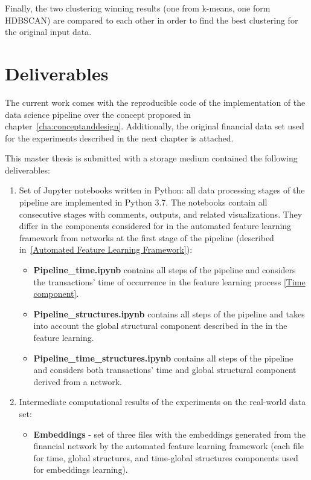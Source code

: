 Finally, the two clustering winning results (one from k-means, one form HDBSCAN) are compared to each other in order to find the best clustering for the original input data.

\section{Deliverables}
The current work comes with the reproducible code of the implementation of the data science pipeline over the concept proposed in chapter~\ref{cha:conceptanddesign}. Additionally, the original financial data set used for the experiments described in the next chapter is attached.

This master thesis is submitted with a storage medium contained the following deliverables:
\begin{enumerate}
    \item Set of Jupyter notebooks written in Python: all data processing stages of the pipeline are implemented in Python 3.7. The notebooks contain all consecutive stages with comments, outputs, and related visualizations. They differ in the components considered for in the automated feature learning framework from networks at the first stage of the pipeline (described in~\ref{Automated Feature Learning Framework}):
    \begin{itemize}
        \item \textbf{Pipeline\_time.ipynb} contains all steps of the pipeline and considers the transactions' time of occurrence in the feature learning process \ref{Time component}.
        \item \textbf{Pipeline\_structures.ipynb} contains all steps of the pipeline and takes into account the global structural component described in the \label{Global structural component} in the feature learning.
        \item \textbf{Pipeline\_time\_structures.ipynb} contains all steps of the pipeline and considers both transactions' time and global structural component derived from a network.
    \end{itemize}
    \item Intermediate computational results of the experiments on the real-world data set:
    \begin{itemize}
        \item \textbf{Embeddings} - set of three files with the embeddings generated from the financial network by the automated feature learning framework (each file for time, global structures, and time-global structures components used for embeddings learning).

\end{itemize}
\end{enumerate}
